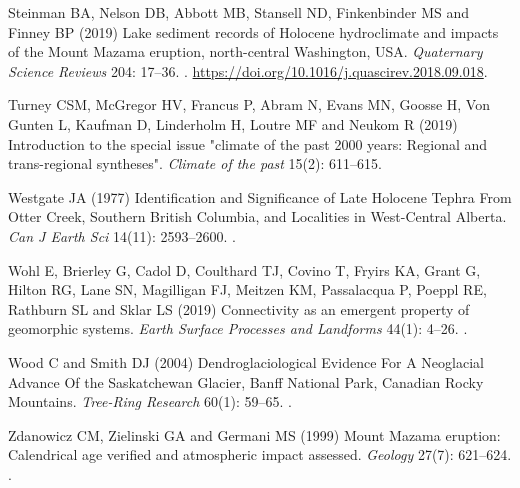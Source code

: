 \documentclass[Royal,times,doublespace,sageh]{sagej}
\begin{document}
\begin{thebibliography}{68}
{
Steinman BA, Nelson DB, Abbott MB, Stansell ND, Finkenbinder MS and Finney BP
  (2019) {Lake sediment records of Holocene hydroclimate and impacts of the
  Mount Mazama eruption, north-central Washington, USA}.
\newblock \emph{Quaternary Science Reviews} 204: 17--36.
\newblock {}.
\newblock \urlprefix\url{https://doi.org/10.1016/j.quascirev.2018.09.018}.

Turney CSM, McGregor HV, Francus P, Abram N, Evans MN, Goosse H, {Von Gunten}
  L, Kaufman D, Linderholm H, Loutre MF and Neukom R (2019) {Introduction to
  the special issue "climate of the past 2000 years: Regional and
  trans-regional syntheses"}.
\newblock \emph{Climate of the past} 15(2): 611--615.

Westgate JA (1977) {Identification and Significance of Late Holocene Tephra
  From Otter Creek, Southern British Columbia, and Localities in West-Central
  Alberta.}
\newblock \emph{Can J Earth Sci} 14(11): 2593--2600.
\newblock {}.

Wohl E, Brierley G, Cadol D, Coulthard TJ, Covino T, Fryirs KA, Grant G, Hilton
  RG, Lane SN, Magilligan FJ, Meitzen KM, Passalacqua P, Poeppl RE, Rathburn SL
  and Sklar LS (2019) {Connectivity as an emergent property of geomorphic
  systems}.
\newblock \emph{Earth Surface Processes and Landforms} 44(1): 4--26.
\newblock {}.

Wood C and Smith DJ (2004) {Dendroglaciological Evidence For A Neoglacial
  Advance Of the Saskatchewan Glacier, Banff National Park, Canadian Rocky
  Mountains}.
\newblock \emph{Tree-Ring Research} 60(1): 59--65.
\newblock {}.

Zdanowicz CM, Zielinski GA and Germani MS (1999) {Mount Mazama eruption:
  Calendrical age verified and atmospheric impact assessed}.
\newblock \emph{Geology} 27(7): 621--624.
\newblock {}.

}
\end{thebibliography}
\end{document}
